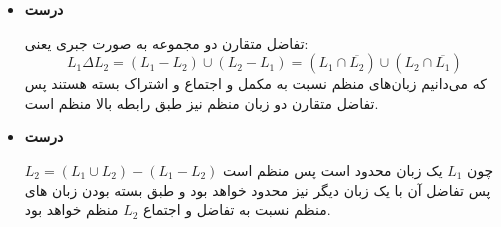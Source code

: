 \documentclass[../HW.tex]{subfiles}
\begin{document}
      \begin{itemize}
            \item[\textbf{(a}] \textbf{درست}

                  تفاضل متقارن دو مجموعه به صورت جبری یعنی:
                  \[
                        L_1 \Delta L_2 = (L_1 - L_2) \cup (L_2 - L_1) = (L_1 \cap \overline{L_2}) \cup (L_2 \cap \overline{L_1})
                  \]
                  که می‌دانیم زبان‌های منظم نسبت به مکمل و اجتماع و اشتراک بسته هستند پس تفاضل متقارن دو زبان منظم نیز طبق رابطه بالا منظم است.




                  \vspace{0.5cm}

            \item[\textbf{(b}] \textbf{درست}

                  $L_2 = (L_1 \cup L_2) - (L_1 - L_2)$ چون $L_1$ یک زبان محدود است پس منظم است پس تفاضل آن با یک زبان دیگر نیز محدود خواهد بود و طبق بسته بودن زبان های منظم نسبت به تفاضل و اجتماع $L_2$ منظم خواهد بود.

                  \vspace{0.5cm}




\end{itemize}
\end{document}
